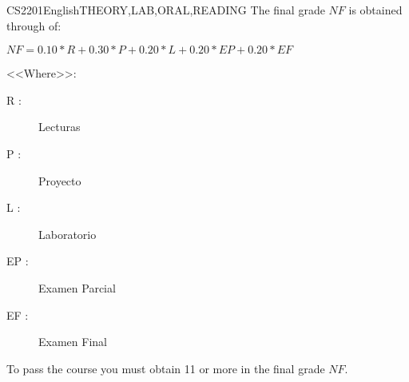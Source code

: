 \begin{evaluation}{CS2201}{English}{THEORY,LAB,ORAL,READING}
The final grade $NF$ is obtained through of:

  $ NF =  0.10*R + 0.30*P + 0.20*L + 0.20*EP + 0.20*EF $

<<Where>>:
\begin{description}
    \item[R :] Lecturas
    \item[P :] Proyecto
    \item[L :] Laboratorio
    \item[EP :] Examen Parcial
    \item[EF :] Examen Final
\end{description}

	To pass the course you must obtain 11 or more in the final grade $NF$.
\end{evaluation}
